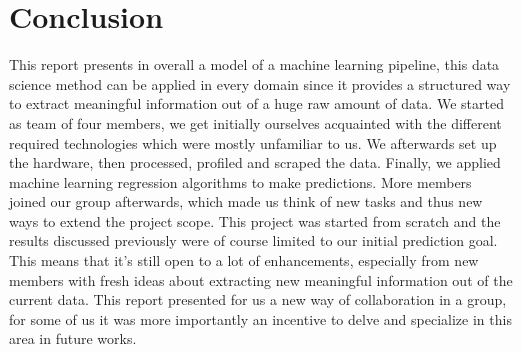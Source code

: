 
\section{Conclusion}
This report presents in overall a model of a machine learning pipeline, this data science method can be applied in every domain since it provides a structured way to extract meaningful information out of a huge raw amount of data.
We started as team of four members,  we get initially ourselves acquainted with the different required technologies which were mostly unfamiliar to us. We afterwards set up the hardware, then processed, profiled and scraped the data. Finally, we applied machine learning regression algorithms to make predictions.
More members joined our group afterwards, which made us think of new tasks and thus new ways to extend the project scope. 
This project was started from scratch and the results discussed previously were of course limited to our initial prediction goal.  This means that it's still open to a lot of enhancements, especially from new members with fresh ideas about extracting new meaningful information out of the current data.
This report presented  for us  a new way of collaboration in a group, for some of us it was more importantly an incentive to delve and specialize in this area in future works. 

